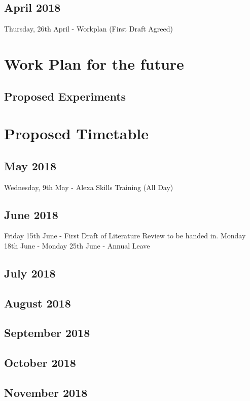 \documentclass{article}
\begin{document}
	\subsection{April 2018}
	
	Thursday, 26th April - Workplan (First Draft Agreed)

	
	\section{Work Plan for the future}
	\subsection{Proposed Experiments}
	

	
	\section{Proposed Timetable}
	
	\subsection{May 2018}
	Wednesday, 9th May - Alexa Skills Training (All Day)
	\subsection{June 2018}
	Friday 15th June - First Draft of Literature Review to be handed in.
	\newline
	Monday 18th June - Monday 25th June - Annual Leave
	\subsection{July 2018}
	
	\subsection{August 2018}
	
	\subsection{September 2018}
	
	\subsection{October 2018}
	
	\subsection{November 2018}
	
\end{document}
